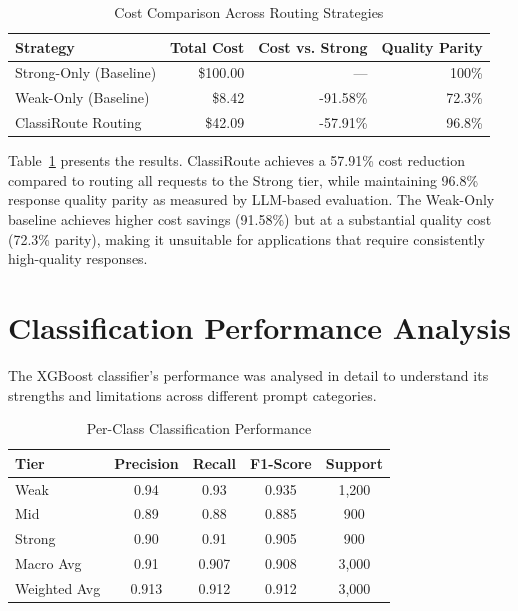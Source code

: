 \documentclass[oneside,12pt,a4paper]{report}
\begin{document}
\begin{table}[htbp]
  \centering
  \caption{Cost Comparison Across Routing Strategies}
  \label{tab:cost_analysis}
  \begin{tabular}{lrrr}
    \toprule
    \textbf{Strategy} & \textbf{Total Cost} & \textbf{Cost vs. Strong} & \textbf{Quality Parity} \\
    \midrule
    Strong-Only (Baseline) & \$100.00 & --- & 100\% \\
    Weak-Only (Baseline) & \$8.42 & -91.58\% & 72.3\% \\
    ClassiRoute Routing & \$42.09 & -57.91\% & 96.8\% \\
    \bottomrule
  \end{tabular}
\end{table}

Table~\ref{tab:cost_analysis} presents the results. ClassiRoute achieves a 57.91\% cost reduction compared to routing all requests to the Strong tier, while maintaining 96.8\% response quality parity as measured by LLM-based evaluation. The Weak-Only baseline achieves higher cost savings (91.58\%) but at a substantial quality cost (72.3\% parity), making it unsuitable for applications that require consistently high-quality responses.

\section{Classification Performance Analysis}

The XGBoost classifier's performance was analysed in detail to understand its strengths and limitations across different prompt categories.

\begin{table}[htbp]
  \centering
  \caption{Per-Class Classification Performance}
  \label{tab:per_class}
  \begin{tabular}{lcccc}
    \toprule
    \textbf{Tier} & \textbf{Precision} & \textbf{Recall} & \textbf{F1-Score} & \textbf{Support} \\
    \midrule
    Weak & 0.94 & 0.93 & 0.935 & 1,200 \\
    Mid & 0.89 & 0.88 & 0.885 & 900 \\
    Strong & 0.90 & 0.91 & 0.905 & 900 \\
    \midrule
    Macro Avg & 0.91 & 0.907 & 0.908 & 3,000 \\
    Weighted Avg & 0.913 & 0.912 & 0.912 & 3,000 \\
    \bottomrule
  \end{tabular}
\end{table}
\end{document}
